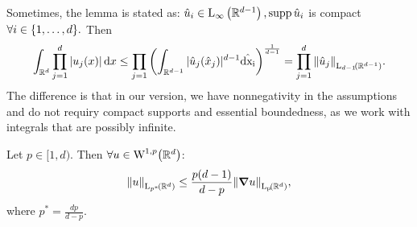 \documentclass{article}
\begin{document}
\begin{remark}
	Sometimes, the lemma is stated as: $\hat{u}_i \in \text{L}_{\infty}\!\,\left({\mathbb R}^{d-1} \right), \operatorname{supp} \hat{u}_i$ is compact $\forall i \in \qty{1,\dots,d}.$ Then
	\[
		\int_{\R^{d}}\prod_{j=1}^d|u_j(x)|\dd{x} \leq \prod_{j=1}\qty(\int_{\R^{d-1}}|\hat{u}_j(\hat{x}_j)|^{d-1}\hat{\dd{x_i}})^{\frac{1}{d-1}} = \prod_{j=1}^d \norm{\hat{u}_j}_{\LpSet[d-1]{\R^{d-1}}}.
	\]
	The difference is that in our version, we have nonnegativity in the assumptions and do not requiry compact supports and essential boundedness, as we work with integrals that are possibly infinite.
\end{remark}

\begin{theorem}
	Let $p \in [1,d).$ Then $\forall u \in \WkpSet[1][p]{\R^d}$:
	\[
		\norm{u}_{\LpSet[p^{*}]{\R^d}}\leq \frac{p(d-1)}{d-p} \norm{\grad u}_{\LpSet{\R^d}}, 
	\]
	where $p^{*}=\frac{dp}{d-p}.$
\end{theorem}
\end{document}
